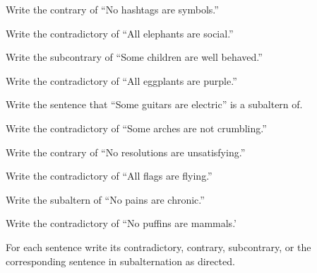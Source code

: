 \begin{exercises}
\item Write the contrary of ``No hashtags are symbols.'' 	

\item Write the contradictory of ``All elephants are social.'' 

\item Write the subcontrary of ``Some children are well behaved.'' 

\item Write the contradictory of ``All eggplants are purple.'' 
 
\item Write the sentence that ``Some guitars are electric'' is a subaltern of.  

 \item Write the contradictory of  ``Some arches are not crumbling.'' 
 
\item Write the contrary of ``No resolutions are unsatisfying.'' 

 \item Write the contradictory of  ``All flags are flying.'' 
 
\item Write the subaltern of ``No pains are chronic.'' 
 
\item Write the contradictory of  ``No puffins are mammals.'
\end{exercises}


\noindent \problempart For each sentence write its contradictory, contrary, subcontrary, or the corresponding sentence in subalternation as directed.

